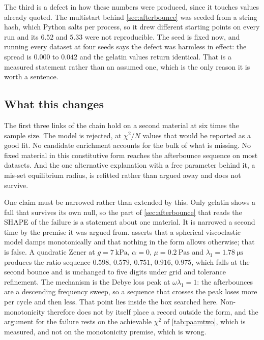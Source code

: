 \documentclass[10pt]{article}
\begin{document}
The third is a defect in how these numbers were produced, since it touches values already
quoted. The multistart behind \cref{sec:afterbounce} was seeded from a string hash, which Python
salts per process, so it drew different starting points on every run and its $6.52$ and $5.33$
were not reproducible. The seed is fixed now, and running every dataset at four seeds says the
defect was harmless in effect: the spread is $0.000$ to $0.042$ and the gelatin values return
identical. That is a measured statement rather than an assumed one, which is the only reason it
is worth a sentence.

\subsection*{What this changes}

The first three links of the chain hold on a second material at six times the sample size. The
model is rejected, at $\chi^2/N$ values that would be reported as a good fit. No candidate
enrichment accounts for the bulk of what is missing. No fixed material in this constitutive form
reaches the afterbounce sequence on most datasets. And the one alternative explanation with a
free parameter behind it, a mis-set equilibrium radius, is refitted rather than argued away and
does not survive.

One claim must be narrowed rather than extended by this. Only gelatin shows a fall that survives
its own null, so the part of \cref{sec:afterbounce} that reads the SHAPE of the failure is a
statement about one material. It is narrowed a second time by the premise it was argued from.
 asserts that a spherical viscoelastic model damps monotonically and that
nothing in the form allows otherwise; that is false. A quadratic Zener at $g = \SI{7}{\kilo\pascal}$,
$\alpha = 0$, $\mu = \SI{0.2}{\pascal\second}$ and $\lambda_1 = \SI{1.78}{\micro\second}$ produces
the ratio sequence $0.598$, $0.579$, $0.751$, $0.916$, $0.975$, which falls at the second bounce
and is unchanged to five digits under grid and tolerance refinement. The mechanism is the Debye
loss peak at $\omega\lambda_1 = 1$: the afterbounces are a descending frequency sweep, so a
sequence that crosses the peak loses more per cycle and then less. That point lies inside the box
searched here. Non-monotonicity therefore does not by itself place a record outside the form, and
the argument for the failure rests on the achievable $\chi^2$ of \cref{tab:paamtwo}, which is
measured, and not on the monotonicity premise, which is wrong.
\end{document}
